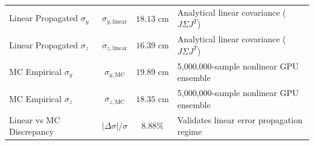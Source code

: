 \begin{table}[htbp]
\begin{tabular}{lccl}
\midrule
Linear Propagated $\sigma_y$ & $\sigma_{y,\text{linear}}$ & $18.13\text{ cm}$ & Analytical linear covariance ($J \Sigma J^T$) \\
Linear Propagated $\sigma_z$ & $\sigma_{z,\text{linear}}$ & $16.39\text{ cm}$ & Analytical linear covariance ($J \Sigma J^T$) \\
MC Empirical $\sigma_y$ & $\sigma_{y,\text{MC}}$ & $19.89\text{ cm}$ & 5,000,000-sample nonlinear GPU ensemble \\
MC Empirical $\sigma_z$ & $\sigma_{z,\text{MC}}$ & $18.35\text{ cm}$ & 5,000,000-sample nonlinear GPU ensemble \\
Linear vs MC Discrepancy & $|\Delta \sigma| / \sigma$ & $8.88\%$ & Validates linear error propagation regime \\
\bottomrule
\end{tabular}
\end{table}
